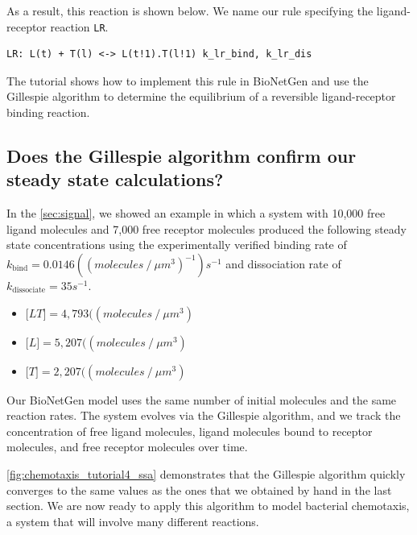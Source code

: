 As a result, this reaction is shown below. We name our rule specifying the ligand-receptor reaction \texttt{LR}.


\begin{verbatim}
LR: L(t) + T(l) <-> L(t!1).T(l!1) k_lr_bind, k_lr_dis
\end{verbatim}

The tutorial  shows how to implement this rule in BioNetGen and use the Gillespie algorithm to determine the equilibrium of a reversible ligand-receptor binding reaction.


\FloatBarrier
{}
\subsection{Does the Gillespie algorithm confirm our steady state calculations?}

In the \autoref{sec:signal}, we showed an example in which a system with 10,000 free ligand molecules and 7,000 free receptor molecules produced the following steady state concentrations using the experimentally verified binding rate of $k_\text{bind} = 0.0146 ((molecules\mathbin{/}\mu m^3)^{-1})s^{-1}$ and dissociation rate of $k_\text{dissociate} = 35s^{-1}$.

\begin{itemize}
\item $\text{[}LT\text{]} = 4,793 ((molecules\mathbin{/}\mu m^3)$
\item $\text{[}L\text{]} = 5,207 ((molecules\mathbin{/}\mu m^3)$
\item $\text{[}T\text{]} = 2,207 ((molecules\mathbin{/}\mu m^3)$
\end{itemize}

Our BioNetGen model uses the same number of initial molecules and the same reaction rates. The system evolves via the Gillespie algorithm, and we track the concentration of free ligand molecules, ligand molecules bound to receptor molecules, and free receptor molecules over time.

\autoref{fig:chemotaxis_tutorial4_ssa} demonstrates that the Gillespie algorithm quickly converges to the same values as the ones that we obtained by hand in the last section. We are now ready to apply this algorithm to model bacterial chemotaxis, a system that will involve many different reactions.

